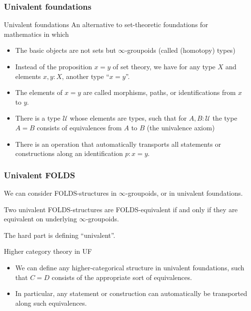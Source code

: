 \documentclass{beamer}
\begin{document}
\begin{frame}
  \frametitle{Univalent foundations}
  \begin{block}{Univalent foundations}
    An alternative to set-theoretic foundations for mathematics in which
    \begin{itemize}
    \item The basic objects are not sets but $\infty$-groupoids (called \alert<1>{(homotopy) types})
      \pause
    \item Instead of the \alert<2>{proposition} $x=y$ of set theory, we have for any type $X$ and elements $x,y:X$, \alert<2>{another type} ``$x=y$''.
      \pause
    \item The elements of $x=y$ are called \alert<3>{morphisms}, \alert<3>{paths}, or \alert<3>{identifications} from $x$ to $y$.
      \pause
    \item There is a type $\mathcal{U}$ whose elements are types, such that for $A,B:\mathcal{U}$ the type $A=B$ consists of \alert<4>{equivalences} from $A$ to $B$ (the \alert<4>{univalence axiom})
      \pause
    \item There is an operation that automatically transports all statements \alert<5>{or constructions} along an identification $p:x=y$.
    \end{itemize}
  \end{block}
\end{frame}

\begin{frame}
  \frametitle{Univalent FOLDS}
  We can consider FOLDS-structures in $\infty$-groupoids, or in univalent foundations.
  \begin{theorem}[in progress]
    Two \alert<1>{univalent} FOLDS-structures are FOLDS-equivalent if and only if they are equivalent on underlying $\infty$-groupoids.
  \end{theorem}
   The hard part is defining ``univalent''.
  \pause\medskip
  \begin{block}{Higher category theory in UF}
    \begin{itemize}
    \item We can define \alert{any higher-categorical structure} in univalent foundations, such that $C=D$ consists of the appropriate sort of  equivalences.
    \item In particular, any statement \alert{or construction} can automatically be transported along such equivalences.
  \end{itemize}
  \end{block}
\end{frame}
\end{document}
